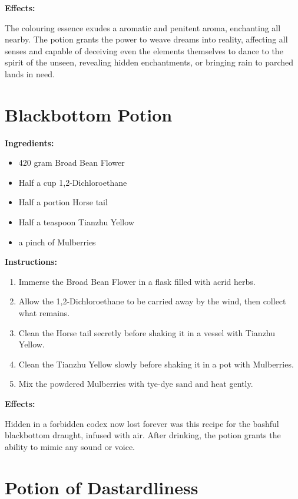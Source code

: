\documentclass{article}
\begin{document}
\textbf{Effects:}

The colouring essence exudes a aromatic and penitent aroma, enchanting all nearby. The potion grants the power to weave dreams into reality, affecting all senses and capable of deceiving even the elements themselves to dance to the spirit of the unseen, revealing hidden enchantments, or bringing rain to parched lands in need.

\newpage
\section*{Blackbottom Potion}

\textbf{Ingredients:}

\begin{itemize}
  \item 420 gram Broad Bean Flower
  \item Half a cup 1,2-Dichloroethane
  \item Half a portion Horse tail
  \item Half a teaspoon Tianzhu Yellow
  \item a pinch of Mulberries
\end{itemize}

\textbf{Instructions:}

\begin{enumerate}
  \item Immerse the Broad Bean Flower in a flask filled with acrid herbs.
  \item Allow the 1,2-Dichloroethane to be carried away by the wind, then collect what remains.
  \item Clean the Horse tail secretly before shaking it in a vessel with Tianzhu Yellow.
  \item Clean the Tianzhu Yellow slowly before shaking it in a pot with Mulberries.
  \item Mix the powdered Mulberries with tye-dye sand and heat gently.
\end{enumerate}

\textbf{Effects:}

Hidden in a forbidden codex now lost forever was this recipe for the bashful blackbottom draught, infused with air. After drinking, the potion grants the ability to mimic any sound or voice.

\newpage
\section*{Potion of Dastardliness}
\end{document}
